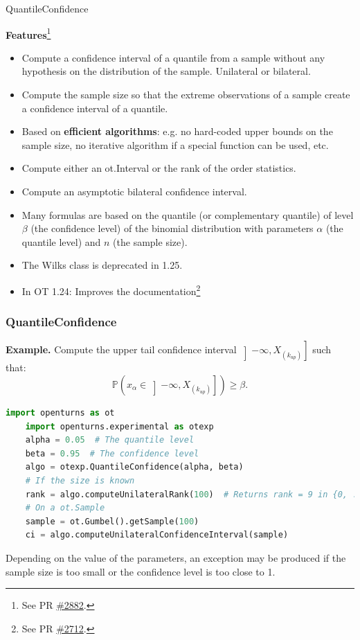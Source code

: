 \documentclass[aspectratio=169]{beamer}
\begin{document}

\begin{frame}{QuantileConfidence}

  \textbf{Features}\footnote{See 
  PR \href{https://github.com/openturns/openturns/pull/2882}{\#2882}.}
  \begin{itemize}
    \item Compute a confidence interval of a quantile from a sample without 
    any hypothesis on the distribution of the sample. Unilateral or bilateral.
    \item Compute the sample size so that the extreme observations of a sample 
    create a confidence interval of a quantile.
    \item Based on \textbf{efficient algorithms}: e.g. no hard-coded upper 
    bounds on the sample size, no iterative algorithm if a special function 
    can be used, etc.
    \item Compute either an \textrm{ot.Interval} or the rank of the order 
    statistics.
    \item Compute an asymptotic bilateral confidence interval.
    \item Many formulas are based on the quantile (or complementary quantile) 
    of level $\beta$ (the     confidence level) of the binomial distribution 
    with parameters $\alpha$ 
    (the quantile level) and $n$ (the sample size).
    \item The \textrm{Wilks} class is deprecated in 1.25.
    \item In OT 1.24: Improves the documentation\footnote{See 
    PR \href{https://github.com/openturns/openturns/pull/2712}{\#2712}.}
  \end{itemize}

\end{frame}


\begin{frame}[fragile]
  \frametitle{QuantileConfidence}
  \textbf{Example.}
  Compute the upper tail confidence interval $\left]-\infty, X_{(k_{up})}\right]$ 
  such that:
  \[
  \mathbb{P}\left( x_{\alpha} \in \left]-\infty, X_{(k_{up})}\right]\right) \geq \beta.
  \]
  \begin{lstlisting}[language=Python]
    import openturns as ot
    import openturns.experimental as otexp
    alpha = 0.05  # The quantile level
    beta = 0.95  # The confidence level
    algo = otexp.QuantileConfidence(alpha, beta)
    # If the size is known
    rank = algo.computeUnilateralRank(100)  # Returns rank = 9 in {0, ..., 99}
    # On a ot.Sample
    sample = ot.Gumbel().getSample(100)
    ci = algo.computeUnilateralConfidenceInterval(sample)
  \end{lstlisting}

  Depending on the value of the parameters, an exception may be produced if 
  the sample size is too small or the confidence level is too close to 1.

\end{frame}
  
\end{document}
